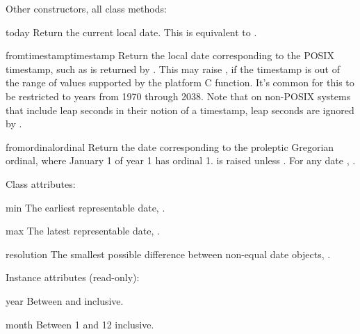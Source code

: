 Other constructors, all class methods:

\begin{methoddesc}{today}{}
  Return the current local date.  This is equivalent to
  .
\end{methoddesc}

\begin{methoddesc}{fromtimestamp}{timestamp}
  Return the local date corresponding to the POSIX timestamp, such
  as is returned by .  This may raise
  , if the timestamp is out of the range of
  values supported by the platform C 
  function.  It's common for this to be restricted to years from 1970
  through 2038.  Note that on non-POSIX systems that include leap
  seconds in their notion of a timestamp, leap seconds are ignored by
  .
\end{methoddesc}

\begin{methoddesc}{fromordinal}{ordinal}
  Return the date corresponding to the proleptic Gregorian ordinal,
  where January 1 of year 1 has ordinal 1.   is
  raised unless .
  For any date , .
\end{methoddesc}

Class attributes:

\begin{memberdesc}{min}
  The earliest representable date, .
\end{memberdesc}

\begin{memberdesc}{max}
  The latest representable date, .
\end{memberdesc}

\begin{memberdesc}{resolution}
  The smallest possible difference between non-equal date
  objects, .
\end{memberdesc}

Instance attributes (read-only):

\begin{memberdesc}{year}
  Between  and  inclusive.
\end{memberdesc}

\begin{memberdesc}{month}
  Between 1 and 12 inclusive.
\end{memberdesc}

